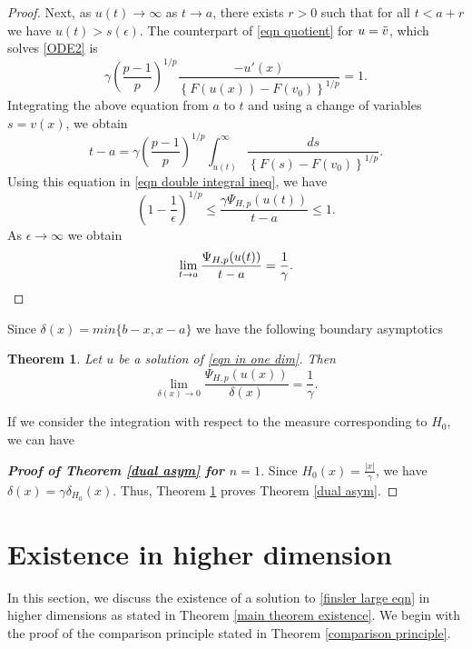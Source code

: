 \documentclass[11pt]{amsart}
\newtheorem{theorem}{Theorem}[section]
\numberwithin{equation}{section}
\begin{document}
\begin{proof}
   Next, as $u(t)\to \infty$ as $t\to a$, there exists $r>0$ such that for all $t<a+r$ we have $u(t)>s(\epsilon)$. The counterpart of \eqref{eqn quotient} for $u=\Tilde{v}$, which solves \eqref{ODE2} is 
   \begin{equation*}
       \gamma\left(\frac{p-1}{p}\right)^{1/p}\frac{-u'(x)}{\left\{F\left(u(x)\right)-F(v_{0})\right\}^{1/p}}=1.
   \end{equation*}
   Integrating the above equation from $a$ to $t$ and using a change of variables $s=v(x)$, we obtain  
   \begin{equation*}
       t-a=\gamma\left(\frac{p-1}{p}\right)^{1/p}\int_{u(t)}^{\infty}\frac{ds}{\left\{F(s)-F(v_{0})\right\}^{1/p}}.
   \end{equation*}
   Using this equation in \eqref{eqn double integral ineq}, we have 
    \begin{equation*}
       \left(1-\frac{1}{\epsilon}\right)^{1/p}\leq \frac{\gamma\Psi_{H,p}(u(t))}{t-a}\leq 1.
   \end{equation*}
   As $\epsilon\to \infty$ we obtain 
   \begin{equation*}
       \lim_{t\to a}\frac{\Psi_{H,p}(u(t))}{t-a}=\frac{1}{\gamma}.\qedhere
   \end{equation*}
\end{proof}
Since $\delta(x)=min\{b-x,x-a\}$ we have the following boundary asymptotics
\begin{theorem}\label{theorem boy asylum 1d}
        Let $u$ be a solution of \eqref{eqn in one dim}. Then
    \begin{equation*}
       \lim_{\delta(x)\to 0}\frac{\Psi_{H,p}(u(x))}{\delta(x)}= \frac{1}{\gamma}.
    \end{equation*}
\end{theorem}

    If we consider the integration with respect to the measure corresponding to $H_{0}$, we can have  
   \begin{proof}[\textbf{Proof of Theorem \ref{dual asym} for $n=1$}]
      Since $H_{0}(x)=\frac{|x|}{\gamma}$, we have $\delta(x)=\gamma \delta_{H_{0}}(x)$. Thus, Theorem \ref{theorem boy asylum 1d} proves Theorem \ref{dual asym}.
   \end{proof}


\section{Existence in higher dimension}\label{higher dim}
 In this section, we discuss the existence of a solution to \eqref{finsler large eqn} in higher dimensions as stated in Theorem \ref{main theorem existence}.  We begin with the proof of the comparison principle stated in Theorem \ref{comparison principle}. 
\end{document}
